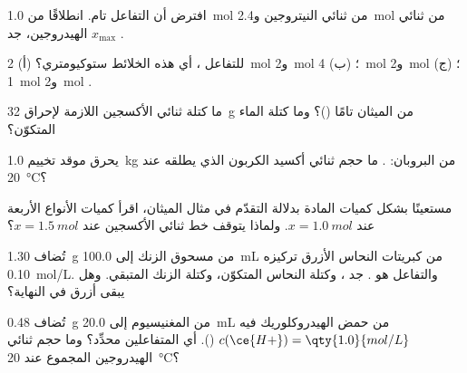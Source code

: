 \begin{exercise}[$\star$]\label{exo:g10:reaction-progress-table:4}
افترض أن التفاعل  تام. انطلاقًا من
\qty{1.0}{mol} من ثنائي النيتروجين و\qty{2.4}{mol} من ثنائي الهيدروجين، جد
$x_{\max}$ .
\end{exercise}

\begin{exercise}[$\star$]\label{exo:g10:reaction-progress-table:5}
للتفاعل ، أي هذه الخلائط ستوكيومتري؟
(أ) \qty{2}{mol}  و\qty{2}{mol} ؛ (ب) \qty{4}{mol}
 و\qty{2}{mol} ؛ (ج) \qty{1}{mol} 
و\qty{2}{mol} .
\end{exercise}

\begin{exercise}[$\star\star$]\label{exo:g10:reaction-progress-table:6}
ما كتلة ثنائي الأكسجين اللازمة لإحراق \qty{32}{g} من الميثان  تامًا
()؟ وما كتلة الماء المتكوّن؟
\end{exercise}

\begin{exercise}[$\star\star$]\label{exo:g10:reaction-progress-table:7}
يحرق موقد تخييم \qty{1.0}{kg} من البروبان:
. ما حجم ثنائي أكسيد الكربون الذي يطلقه عند
\qty{20}{\celsius}؟
\end{exercise}

\begin{exercise}[$\star\star$]\label{exo:g10:reaction-progress-table:8}
مستعينًا بشكل كميات المادة بدلالة التقدّم في مثال الميثان، اقرأ كميات الأنواع
الأربعة عند $x = \qty{1.0}{mol}$. ولماذا يتوقف خط ثنائي الأكسجين عند
$x = \qty{1.5}{mol}$؟
\end{exercise}

\begin{exercise}[$\star\star$]\label{exo:g10:reaction-progress-table:9}
تُضاف \qty{1.30}{g} من مسحوق الزنك إلى \qty{100.0}{mL} من  كبريتات
النحاس الأزرق تركيزه \qty{0.10}{mol/L}. والتفاعل هو
.
جد ، وكتلة النحاس المتكوّن، وكتلة الزنك المتبقي. وهل يبقى
 أزرق في النهاية؟
\end{exercise}

\begin{exercise}[$\star\star$]\label{exo:g10:reaction-progress-table:10}
تُضاف \qty{0.48}{g} من المغنيسيوم إلى \qty{20.0}{mL} من حمض الهيدروكلوريك
فيه $c(\ce{H+}) = \qty{1.0}{mol/L}$
(). أي المتفاعلين محدِّد؟ وما حجم ثنائي
الهيدروجين المجموع عند \qty{20}{\celsius}؟
\end{exercise}

